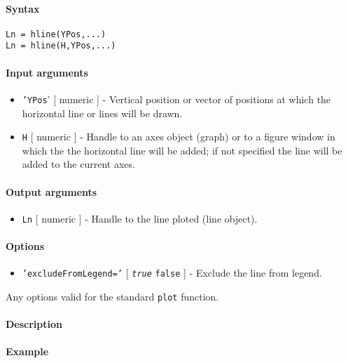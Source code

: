 


	\paragraph{Syntax}

\begin{verbatim}
Ln = hline(YPos,...)
Ln = hline(H,YPos,...)
\end{verbatim}

\paragraph{Input arguments}

\begin{itemize}
\item
  \texttt{'YPos}' {[} numeric {]} - Vertical position or vector of
  positions at which the horizontal line or lines will be drawn.
\item
  \texttt{H} {[} numeric {]} - Handle to an axes object (graph) or to a
  figure window in which the the horizontal line will be added; if not
  specified the line will be added to the current axes.
\end{itemize}

\paragraph{Output arguments}

\begin{itemize}
\itemsep1pt\parskip0pt
\item
  \texttt{Ln} {[} numeric {]} - Handle to the line ploted (line object).
\end{itemize}

\paragraph{Options}

\begin{itemize}
\itemsep1pt\parskip0pt
\item
  \texttt{'excludeFromLegend='} {[} \emph{\texttt{true}} \textbar{}
  \texttt{false} {]} - Exclude the line from legend.
\end{itemize}

Any options valid for the standard \texttt{plot} function.

\paragraph{Description}

\paragraph{Example}


